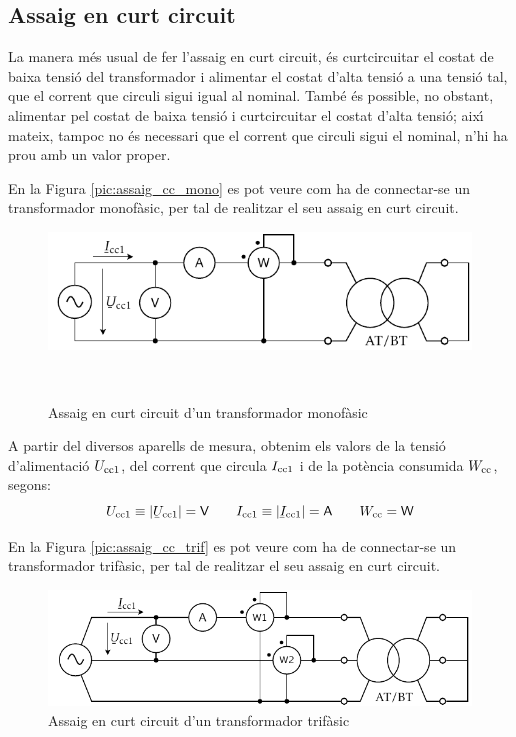 \subsection{Assaig en curt circuit}

La manera m\'{e}s usual de fer l'assaig en curt circuit, \'{e}s
curtcircuitar el costat de baixa tensi\'{o} del transformador i
alimentar el costat d'alta tensi\'{o} a  una tensi\'{o} tal, que el corrent
que circuli sigui igual al nominal. Tamb\'{e} \'{e}s possible, no obstant,
alimentar pel costat de baixa tensi\'{o} i curtcircuitar el costat
d'alta tensi\'{o}; aix\'{\i} mateix, tampoc no \'{e}s necessari que el corrent
que circuli sigui el nominal, n'hi ha prou amb un valor proper.

En la Figura \vref{pic:assaig_cc_mono} es pot veure com ha de
connectar-se un transformador monof\`{a}sic, per tal de realitzar el seu
assaig en curt circuit.

\begin{figure}[htb]
\centering
    \includegraphics{Imatges/Cap-TrafosPot-Assaig-CC-Monofasic.pdf}
\caption{Assaig en curt circuit d'un transformador monof\`{a}sic}
\label{pic:assaig_cc_mono} \
\end{figure}

A partir del diversos aparells de mesura, obtenim els valors de la
tensi\'{o} d'alimentaci\'{o} $U_\mathrm{cc1}$, del corrent que circula
$I_\mathrm{cc1}$ i de la pot\`{e}ncia consumida $W_\mathrm{cc}$, segons:
\begin{equation}
    U\ped{cc1}\equiv|\cmplx{U}\ped{cc1}|=\textsf{V} \qquad
    I\ped{cc1}\equiv|\cmplx{I}\ped{cc1}|=\textsf{A}
     \qquad W\ped{cc}=\textsf{W}
\end{equation}

En la Figura \vref{pic:assaig_cc_trif} es pot veure com ha de
connectar-se un transformador trif\`{a}sic, per tal de realitzar el seu
assaig en curt circuit.

\begin{figure}[htb]
\centering
    \includegraphics{Imatges/Cap-TrafosPot-Assaig-CC-Trifasic.pdf}
\caption{Assaig en curt circuit d'un transformador trif\`{a}sic}
\label{pic:assaig_cc_trif}
\end{figure}



